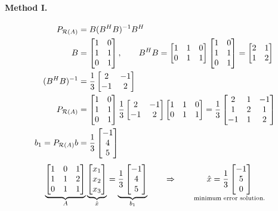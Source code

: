 \begin{example}
\paragraph{Method I.}
\begin{align*}
P_{\mathcal{R}(A)}&=B(B^{H} B)^{-1}B^{H}\\
B&=\begin{bmatrix}1&0\\1&1\\0&1\end{bmatrix},\qquad B^{H} B=\begin{bmatrix}1&1&0\\0&1&1\end{bmatrix}\begin{bmatrix}1&0\\1&1\\0&1\end{bmatrix}=\begin{bmatrix}2&1\\1&2\end{bmatrix}\\
(B^{H} B)^{-1}&=\frac13\begin{bmatrix}2&-1\\-1&2\end{bmatrix}\\
P_{\mathcal{R}(A)}&=\begin{bmatrix}1&0\\1&1\\0&1\end{bmatrix}\frac13\begin{bmatrix}2&-1\\-1&2\end{bmatrix}\begin{bmatrix}1&1&0\\0&1&1\end{bmatrix}=\frac13\begin{bmatrix}2&1&-1\\1&2&1\\-1&1&2\end{bmatrix}\\
b_1=P_{\mathcal{R}(A)}b&=\frac13\begin{bmatrix}-1\\4\\5\end{bmatrix}
\end{align*}
\[
\underbrace{\begin{bmatrix}1&0&1\\1&1&2\\0&1&1\end{bmatrix}}_{A}\underbrace{\begin{bmatrix}x_1\\x_2\\x_3\end{bmatrix}}_{\hat{x}}=\underbrace{\frac13\begin{bmatrix}-1\\4\\5\end{bmatrix}}_{b_1}
\qquad\Rightarrow\qquad \underset{\text{minimum error solution.}}{\hat{x}=\frac13\begin{bmatrix}-1\\5\\0\end{bmatrix}}
\]


\end{example}

